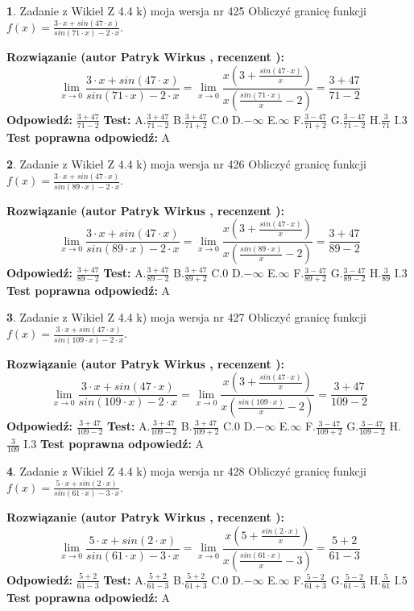 \documentclass[12pt, a4paper]{article}
\theoremstyle{definition} %
\newtheorem{zad}{}
\newcommand{\zadStart}[1]{\begin{zad}#1\newline}
\newcommand{\zadStop}{\end{zad}}
\newcommand{\rozwStart}[2]{\noindent \textbf{Rozwiązanie (autor #1 , recenzent #2): }\newline}
\newcommand{\rozwStop}{\newline}
\newcommand{\odpStart}{\noindent \textbf{Odpowiedź:}\newline}
\newcommand{\odpStop}{\newline}
\newcommand{\testStart}{\noindent \textbf{Test:}\newline}
\newcommand{\testStop}{\newline}
\newcommand{\kluczStart}{\noindent \textbf{Test poprawna odpowiedź:}\newline}
\newcommand{\kluczStop}{\newline}
\begin{document}
\zadStart{Zadanie z Wikieł Z 4.4 k) moja wersja nr 425}
Obliczyć granicę funkcji $f(x)=\frac{3\cdot x +sin(47\cdot x)}{sin(71\cdot x) -2\cdot x}$.
\zadStop
\rozwStart{Patryk Wirkus}{}
$$\lim\limits_{x\to 0}\frac{3\cdot x +sin(47\cdot x)}{sin(71\cdot x) -2\cdot x}
=\lim\limits_{x\to 0}\frac{x(3+\frac{sin(47\cdot x)}{x})}{x(\frac{sin(71\cdot x)}{x}-2)}
=\frac{3+47}{71-2}$$
\rozwStop
\odpStart
$\frac{3+47}{71-2}$
\odpStop
\testStart
A.$\frac{3+47}{71-2}$
B.$\frac{3+47}{71+2}$
C.$0$
D.$-\infty$
E.$\infty$
F.$\frac{3-47}{71+2}$
G.$\frac{3-47}{71-2}$
H.$\frac{3}{71}$
I.$3$
\testStop
\kluczStart
A
\kluczStop



\zadStart{Zadanie z Wikieł Z 4.4 k) moja wersja nr 426}
Obliczyć granicę funkcji $f(x)=\frac{3\cdot x +sin(47\cdot x)}{sin(89\cdot x) -2\cdot x}$.
\zadStop
\rozwStart{Patryk Wirkus}{}
$$\lim\limits_{x\to 0}\frac{3\cdot x +sin(47\cdot x)}{sin(89\cdot x) -2\cdot x}
=\lim\limits_{x\to 0}\frac{x(3+\frac{sin(47\cdot x)}{x})}{x(\frac{sin(89\cdot x)}{x}-2)}
=\frac{3+47}{89-2}$$
\rozwStop
\odpStart
$\frac{3+47}{89-2}$
\odpStop
\testStart
A.$\frac{3+47}{89-2}$
B.$\frac{3+47}{89+2}$
C.$0$
D.$-\infty$
E.$\infty$
F.$\frac{3-47}{89+2}$
G.$\frac{3-47}{89-2}$
H.$\frac{3}{89}$
I.$3$
\testStop
\kluczStart
A
\kluczStop



\zadStart{Zadanie z Wikieł Z 4.4 k) moja wersja nr 427}
Obliczyć granicę funkcji $f(x)=\frac{3\cdot x +sin(47\cdot x)}{sin(109\cdot x) -2\cdot x}$.
\zadStop
\rozwStart{Patryk Wirkus}{}
$$\lim\limits_{x\to 0}\frac{3\cdot x +sin(47\cdot x)}{sin(109\cdot x) -2\cdot x}
=\lim\limits_{x\to 0}\frac{x(3+\frac{sin(47\cdot x)}{x})}{x(\frac{sin(109\cdot x)}{x}-2)}
=\frac{3+47}{109-2}$$
\rozwStop
\odpStart
$\frac{3+47}{109-2}$
\odpStop
\testStart
A.$\frac{3+47}{109-2}$
B.$\frac{3+47}{109+2}$
C.$0$
D.$-\infty$
E.$\infty$
F.$\frac{3-47}{109+2}$
G.$\frac{3-47}{109-2}$
H.$\frac{3}{109}$
I.$3$
\testStop
\kluczStart
A
\kluczStop



\zadStart{Zadanie z Wikieł Z 4.4 k) moja wersja nr 428}
Obliczyć granicę funkcji $f(x)=\frac{5\cdot x +sin(2\cdot x)}{sin(61\cdot x) -3\cdot x}$.
\zadStop
\rozwStart{Patryk Wirkus}{}
$$\lim\limits_{x\to 0}\frac{5\cdot x +sin(2\cdot x)}{sin(61\cdot x) -3\cdot x}
=\lim\limits_{x\to 0}\frac{x(5+\frac{sin(2\cdot x)}{x})}{x(\frac{sin(61\cdot x)}{x}-3)}
=\frac{5+2}{61-3}$$
\rozwStop
\odpStart
$\frac{5+2}{61-3}$
\odpStop
\testStart
A.$\frac{5+2}{61-3}$
B.$\frac{5+2}{61+3}$
C.$0$
D.$-\infty$
E.$\infty$
F.$\frac{5-2}{61+3}$
G.$\frac{5-2}{61-3}$
H.$\frac{5}{61}$
I.$5$
\testStop
\kluczStart
A
\kluczStop
\end{document}
